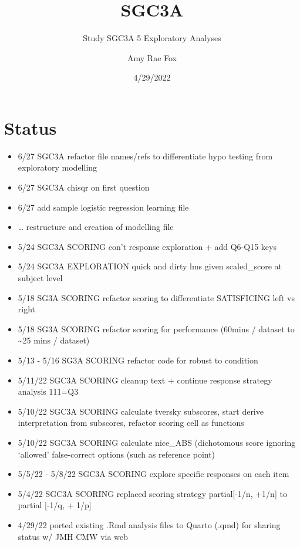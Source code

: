 \documentclass[
  letterpaper,
  DIV=11,
  numbers=noendperiod]{scrreprt}
\title{SGC3A}
\subtitle{Study SGC3A \textbar{} 5 Exploratory Analyses}
\author{Amy Rae Fox}
\date{4/29/2022}
\providecommand{\tightlist}{%
  \setlength{\itemsep}{0pt}\setlength{\parskip}{0pt}}\usepackage{longtable,booktabs,array}
\renewcommand*\contentsname{Table of contents}
\newcommand\contentsname{Table of contents}
\begin{document}
\maketitle

\ifdefined\Shaded\renewenvironment{Shaded}{\begin{tcolorbox}[interior hidden, sharp corners, frame hidden, borderline west={3pt}{0pt}{shadecolor}, breakable, boxrule=0pt, enhanced]}{\end{tcolorbox}}\fi

\renewcommand*\contentsname{Table of contents}
{
\hypersetup{linkcolor=}
\setcounter{tocdepth}{2}
\tableofcontents
}
\hypertarget{status}{%
\chapter*{Status}\label{status}}

\begin{itemize}
\tightlist
\item
  6/27 \textbar{} SGC3A refactor file names/refs to differentiate hypo
  testing from exploratory modelling
\item
  6/27 \textbar{} SGC3A chisqr on first question
\item
  6/27 \textbar{} add sample logistic regression learning file
\item
  \ldots{} restructure and creation of modelling file
\item
  5/24 \textbar{} SGC3A SCORING\textbar{} con't response exploration +
  add Q6-Q15 keys
\item
  5/24 \textbar{} SGC3A EXPLORATION\textbar{} quick and dirty lms given
  scaled\_score at subject level
\item
  5/18 \textbar{} SG3A SCORING \textbar{} refactor scoring to
  differentiate SATISFICING left vs right
\item
  5/18 \textbar{} SG3A SCORING \textbar{} refactor scoring for
  performance (60mins / dataset to \textasciitilde25 mins / dataset)
\item
  5/13 - 5/16 \textbar{} SG3A SCORING \textbar{} refactor code for
  robust to condition
\item
  5/11/22 \textbar{} SGC3A SCORING \textbar{} cleanup text + continue
  response strategy analysis 111=Q3
\item
  5/10/22 \textbar{} SGC3A SCORING \textbar{} calculate tversky
  subscores, start derive interpretation from subscores, refactor
  scoring cell as functions
\item
  5/10/22 \textbar{} SGC3A SCORING \textbar{} calculate nice\_ABS
  (dichotomous score ignoring `allowed' false-correct options (such as
  reference point)
\item
  5/5/22 - 5/8/22 \textbar{} SGC3A SCORING \textbar{} explore specific
  responses on each item
\item
  5/4/22 \textbar{} SGC3A SCORING \textbar{} replaced scoring strategy
  partial{[}-1/n, +1/n{]} to partial {[}-1/q, + 1/p{]}
\item
  4/29/22 \textbar{} ported existing .Rmd analysis files to Quarto
  (.qmd) for sharing status w/ JMH CMW via web
\end{itemize}
\end{document}
